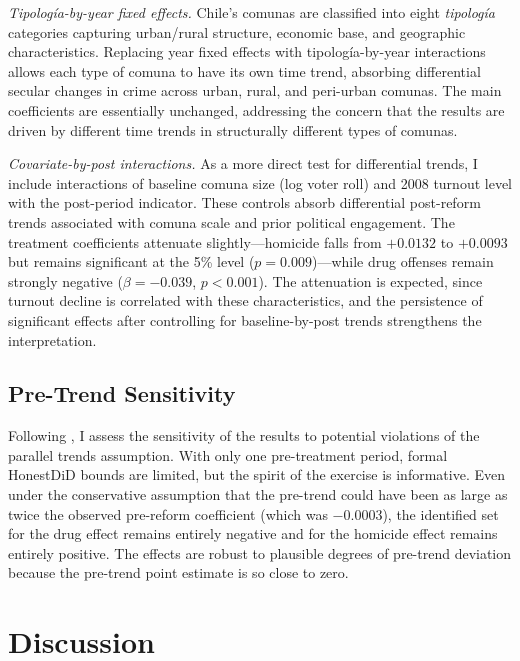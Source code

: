\documentclass[12pt]{article}
\begin{document}
\textit{Tipolog\'{i}a-by-year fixed effects.} Chile's comunas are classified into eight \textit{tipolog\'{i}a} categories capturing urban/rural structure, economic base, and geographic characteristics. Replacing year fixed effects with tipolog\'{i}a-by-year interactions allows each type of comuna to have its own time trend, absorbing differential secular changes in crime across urban, rural, and peri-urban comunas. The main coefficients are essentially unchanged, addressing the concern that the results are driven by different time trends in structurally different types of comunas.

\textit{Covariate-by-post interactions.} As a more direct test for differential trends, I include interactions of baseline comuna size (log voter roll) and 2008 turnout level with the post-period indicator. These controls absorb differential post-reform trends associated with comuna scale and prior political engagement. The treatment coefficients attenuate slightly---homicide falls from $+0.0132$ to $+0.0093$ but remains significant at the 5\% level ($p = 0.009$)---while drug offenses remain strongly negative ($\beta = -0.039$, $p < 0.001$). The attenuation is expected, since turnout decline is correlated with these characteristics, and the persistence of significant effects after controlling for baseline-by-post trends strengthens the interpretation.

\subsection{Pre-Trend Sensitivity}

Following \citet{Rambachan2023}, I assess the sensitivity of the results to potential violations of the parallel trends assumption. With only one pre-treatment period, formal HonestDiD bounds are limited, but the spirit of the exercise is informative. Even under the conservative assumption that the pre-trend could have been as large as twice the observed pre-reform coefficient (which was $-0.0003$), the identified set for the drug effect remains entirely negative and for the homicide effect remains entirely positive. The effects are robust to plausible degrees of pre-trend deviation because the pre-trend point estimate is so close to zero.


\section{Discussion}\label{sec:discussion}
\end{document}

